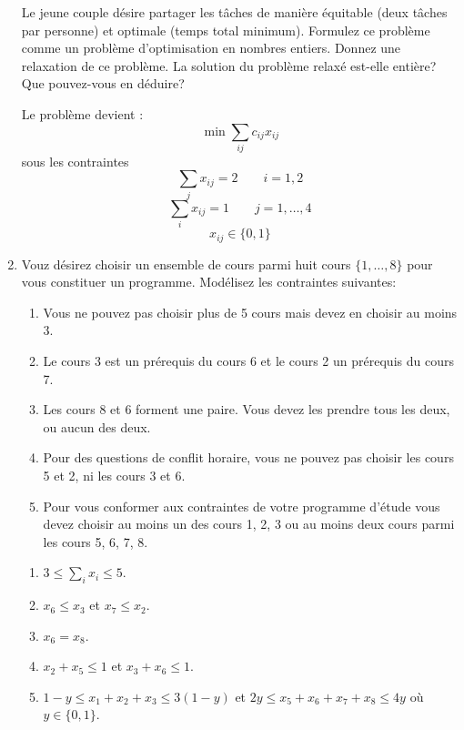 \begin{enumerate}
    Le jeune couple  désire partager les tâches de manière équitable (deux tâches par personne) et optimale (temps total minimum). Formulez
    ce problème comme un problème d'optimisation en nombres entiers. Donnez une relaxation de ce problème. La solution du problème
    relaxé est-elle entière? Que pouvez-vous en déduire?


    \begin{solution}
      Le problème devient : \\
      $$ \min \sum_{ij}c_{ij}x_{ij}$$
      sous les contraintes \\
      $$ \sum_{j} x_{ij} = 2 \qquad i = 1,2$$
       $$ \sum_{i} x_{ij} = 1\qquad j = 1, \dots,4$$
       $$x_{ij} \in \lbrace 0,1\rbrace$$
    \end{solution}

  \item Vouz désirez choisir un ensemble de cours parmi huit cours $\{1, \ldots,
    8 \}$ pour vous constituer un programme. Modélisez les contraintes
    suivantes:

    \begin{enumerate}
      \item Vous ne pouvez pas choisir plus de 5 cours mais devez en choisir au
        moins 3.
      \item Le cours 3 est un prérequis du cours 6 et le cours 2 un prérequis
        du cours 7.
      \item Les cours 8 et 6 forment une paire. Vous devez les prendre tous les
        deux, ou aucun des deux.
      \item Pour des questions de conflit horaire, vous ne pouvez pas choisir
        les cours 5 et 2, ni les cours 3 et 6.
      \item Pour vous conformer aux contraintes de votre programme d'étude vous devez choisir au moins un des cours
        1, 2, 3 ou au moins deux cours parmi les cours 5, 6, 7, 8.
    \end{enumerate}


    \begin{solution}
      \begin{enumerate}
        \item $3 \le \sum_{i} x_{i} \le 5$.
        \item $x_{6} \le x_{3}$ et $x_{7} \le x_{2}$.
        \item $x_{6} = x_{8}$.
        \item $x_{2} + x_{5} \le 1$ et $x_{3} + x_{6} \le 1$.
        \item $ 1-y \le x_{1} + x_{2} + x_{3} \le 3(1-y)$ et
          $ 2y \le x_{5} + x_{6} + x_{7} + x_{8} \le 4y$
          où $y \in \lbrace 0,1\rbrace$.
      \end{enumerate}
    \end{solution}


\end{enumerate}
